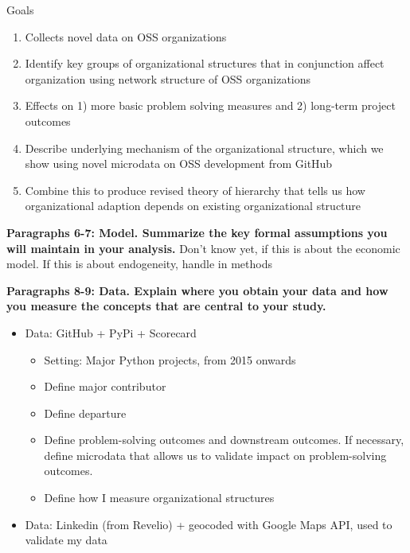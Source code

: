 \documentclass[source/paper/main.tex]{subfiles}
\begin{document}
Goals
\begin{enumerate}
    \item Collects novel data on OSS organizations
    \item Identify key groups of organizational structures that in conjunction affect organization using network structure of OSS organizations 
    \item Effects on 1) more basic problem solving measures and 2) long-term project outcomes 
    \item Describe underlying mechanism of the organizational structure, which we show using novel microdata on OSS development from GitHub
    \item Combine this to produce revised theory of hierarchy that tells us how organizational adaption depends on existing organizational structure 
\end{enumerate}


\textbf{Paragraphs 6-7: Model. Summarize the key formal assumptions you will maintain in your analysis.}
Don't know yet, if this is about the economic model. If this is about endogeneity, handle in methods

\textbf{Paragraphs 8-9: Data. Explain where you obtain your data and how you measure the concepts that are central to your study.}

\begin{itemize}
    \item Data: GitHub + PyPi + Scorecard
    \begin{itemize}
        \item Setting: Major Python projects, from 2015 onwards
        \item Define major contributor
        \item Define departure
        \item Define problem-solving outcomes and downstream outcomes. If necessary, define microdata that allows us to validate impact on problem-solving outcomes. 
        \item Define how I measure organizational structures
    \end{itemize}
    \item Data: Linkedin (from Revelio) + geocoded with Google Maps API, used to validate my data 
\end{itemize}
\end{document}
